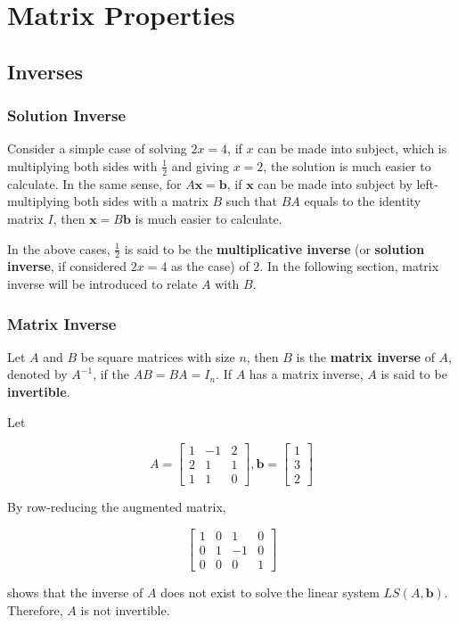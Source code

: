 \documentclass[a4paper,12pt]{article}
\begin{document}
\section{Matrix Properties}
\subsection{Inverses}
\subsubsection{Solution Inverse}
Consider a simple case of solving $2x=4$, if $x$ can be made into subject, which is multiplying both sides with $\frac{1}{2}$ and giving $x=2$, the solution is much easier to calculate. In the same sense, for $A\mathbf{x}=\mathbf{b}$, if $\mathbf{x}$ can be made into subject by left-multiplying both sides with a matrix $B$ such that $BA$ equals to the identity matrix $I$, then $\mathbf{x}=B\mathbf{b}$ is much easier to calculate.\n

In the above cases, $\frac{1}{2}$ is said to be the \textbf{multiplicative inverse} (or \textbf{solution inverse}, if considered $2x=4$ as the case) of $2$. In the following section, matrix inverse will be introduced to relate $A$ with $B$.

\subsubsection{Matrix Inverse}
\begin{dft}
  Let $A$ and $B$ be square matrices with size $n$, then $B$ is the \textbf{matrix inverse} of $A$, denoted by $A^{-1}$, if the $AB=BA=I_{n}$. If $A$ has a matrix inverse, $A$ is said to be \textbf{invertible}.
\end{dft}\n

\begin{exm}
  Let

  $$A=\begin{bmatrix}
    1 & -1 & 2\\
    2 & 1 & 1\\
    1 & 1 & 0
  \end{bmatrix},\mathbf{b}=\begin{bmatrix}
    1\\
    3\\
    2
  \end{bmatrix}$$\s

  By row-reducing the augmented matrix,

  $$\begin{bmatrix}
    1 & 0 & 1 & 0\\
    0 & 1 & -1 & 0\\
    0 & 0 & 0 & 1
  \end{bmatrix}$$\s

  shows that the inverse of $A$ does not exist to solve the linear system $LS(A,\mathbf{b})$. Therefore, $A$ is not invertible.
\end{exm}\n
\end{document}

